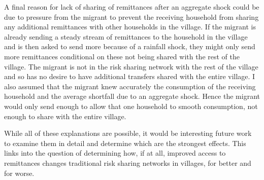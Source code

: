 A final reason for lack of sharing of remittances after an aggregate shock could be due to pressure from the migrant to prevent the receiving household from sharing any additional remittances with other households in the village. If the migrant is already sending a steady stream of remittances to the household in the village and is then asked to send more because of a rainfall shock, they might only send more remittances conditional on these not being shared with the rest of the village. The migrant is not in the risk sharing network with the rest of the village and so has no desire to have additional transfers shared with the entire village. I also assumed that the migrant knew accurately the consumption of the receiving household and the average shortfall due to an aggregate shock. Hence the migrant would only send enough to allow that one household to smooth consumption, not enough to share with the entire village.  

While all of these explanations are possible, it would be interesting future work to examine them in detail and determine which are the strongest effects. This links into the question of determining how, if at all, improved access to remittances changes traditional risk sharing networks in villages, for better and for worse. 



